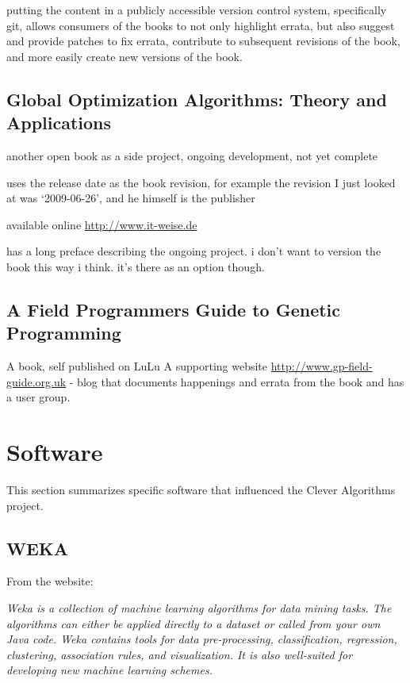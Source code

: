 \documentclass[a4paper, 11pt]{article}
\begin{document}
putting the content in a publicly accessible version control system, specifically git, allows consumers of the books to not only highlight errata, but also suggest and provide patches to fix errata, contribute to subsequent revisions of the book, and more easily create new versions of the book.



\subsection{Global Optimization Algorithms: Theory and Applications}
another open book as a side project, ongoing development, not yet complete \cite{Weise2007}

uses the release date as the book revision, for example the revision I just looked at was `2009-06-26', and he himself is the publisher

available online \url{http://www.it-weise.de}

has a long preface describing the ongoing project. i don't want to version the book this way i think. it's there as an option though.


\subsection{A Field Programmers Guide to Genetic Programming}
A book, self published on LuLu \cite{Poli2008}
A supporting website \url{http://www.gp-field-guide.org.uk} - blog that documents happenings and errata from the book and has a user group.



\section{Software}
\label{sec:software}
This section summarizes specific software that influenced the Clever Algorithms project.

\subsection{WEKA}
From the website: 

\emph{Weka is a collection of machine learning algorithms for data mining tasks. The algorithms can either be applied directly to a dataset or called from your own Java code. Weka contains tools for data pre-processing, classification, regression, clustering, association rules, and visualization. It is also well-suited for developing new machine learning schemes.}
\end{document}
